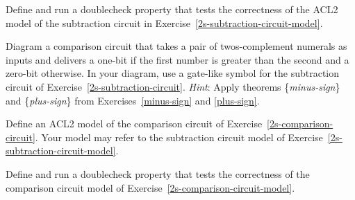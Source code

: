 \begin{ExerciseList}
\Exercise Define and run a doublecheck property that
tests the correctness of
the ACL2 model of the subtraction circuit
in Exercise~\ref{2s-subtraction-circuit-model}.

\Exercise \label{2s-comparison-circuit}
Diagram a comparison circuit that takes a pair of
twos-complement numerals as inputs and delivers a one-bit
if the first number is greater than the second
and a zero-bit otherwise.
In your diagram, use a gate-like symbol
for the subtraction circuit of Exercise~\ref{2s-subtraction-circuit}.
\emph{Hint}: Apply theorems \{\emph{minus-sign}\} and \{\emph{plus-sign}\}
from Exercises~\ref{minus-sign} and \ref{plus-sign}.

\Exercise \label{2s-comparison-circuit-model}
Define an ACL2 model of the comparison circuit
of Exercise~\ref{2s-comparison-circuit}.
Your model may refer to the subtraction circuit model
of Exercise~\ref{2s-subtraction-circuit-model}.

\Exercise Define and run a doublecheck property
that tests the correctness of the comparison circuit model
of Exercise~\ref{2s-comparison-circuit-model}.

\end{ExerciseList}

